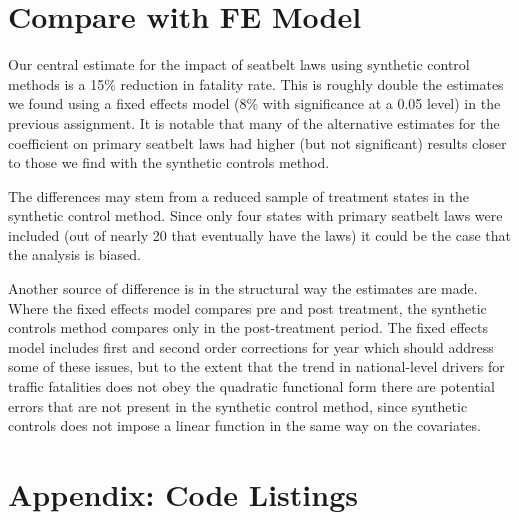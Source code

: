 \documentclass[letterpaper, 12pt]{article}
\begin{document}
\section{Compare with FE Model}

Our central estimate for the impact of seatbelt laws using synthetic control methods is a 15\% reduction in fatality rate.  This is roughly double the estimates we found using a fixed effects model (8\% with significance at a 0.05 level) in the previous assignment.  It is notable that many of the alternative estimates for the coefficient on primary seatbelt laws had higher (but not significant) results closer to those we find with the synthetic controls method.  

The differences may stem from a reduced sample of treatment states in the synthetic control method.  Since only four states with primary seatbelt laws were included (out of nearly 20 that eventually have the laws) it could be the case that the analysis is biased.

Another source of difference is in the structural way the estimates are made.  Where the fixed effects model compares pre and post treatment, the synthetic controls method compares only in the post-treatment period.  The fixed effects model includes first and second order corrections for year which should address some of these issues, but to the extent that the trend in national-level drivers for traffic fatalities does not obey the quadratic functional form there are potential errors that are not present in the synthetic control method, since synthetic controls does not impose a linear function in the same way on the covariates.  

\section{Appendix: Code Listings}



\end{document}
